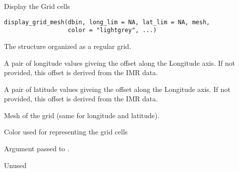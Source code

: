 %
\begin{Description}\relax
Display the Grid cells
\end{Description}
%
\begin{Usage}
\begin{verbatim}
display_grid_mesh(dbin, long_lim = NA, lat_lim = NA, mesh,
                  color = "lightgrey", ...)
\end{verbatim}
\end{Usage}
%
\begin{Arguments}
\begin{ldescription}
\item[\code{dbin}] 
The  structure organized as a regular grid.

\item[\code{long\_lim}] 
A pair of longitude values giveing the offset along the Longitude axis.
If not provided, this offset is derived from the IMR data.

\item[\code{lat\_lim}] 
A pair of latitude values giveing the offset along the Longitude axis.
If not provided, this offset is derived from the IMR data.

\item[\code{mesh}] 
Mesh of the grid (same for longitude and latitude).

\item[\code{color}] 
Color used for representing the grid cells

\item[\code{...}] 
Argument passed to .

\end{ldescription}
\end{Arguments}
%
\begin{Value}
Unused
\end{Value}
